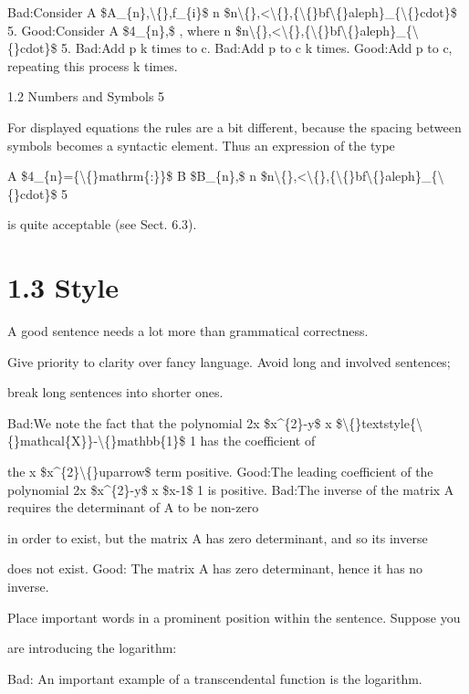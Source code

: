\documentclass[11pt]{article}
\theoremstyle{plain}
\theoremstyle{definition}
\begin{document}
Bad:Consider A \$A\_\{n\},\textbackslash\{\},f\_\{i\}\$ n \$n\textbackslash\{\},<\textbackslash\{\},\{\textbackslash\{\}bf\textbackslash\{\}aleph\}\_\{\textbackslash\{\}cdot\}\$ 5. Good:Consider A \$4\_\{n\},\$ , where n \$n\textbackslash\{\},<\textbackslash\{\},\{\textbackslash\{\}bf\textbackslash\{\}aleph\}\_\{\textbackslash\{\}cdot\}\$ 5. Bad:Add p k times to c. Bad:Add p to c k times. Good:Add p to c, repeating this process k times.

1.2 Numbers and Symbols 5

For displayed equations the rules are a bit different, because the spacing between symbols becomes a syntactic element. Thus an expression of the type

A \$4\_\{n\}=\{\textbackslash\{\}mathrm\{:\}\}\$ B \$B\_\{n\},\$ n \$n\textbackslash\{\},<\textbackslash\{\},\{\textbackslash\{\}bf\textbackslash\{\}aleph\}\_\{\textbackslash\{\}cdot\}\$ 5

is quite acceptable (see Sect. 6.3).

\section{1.3 Style}

A good sentence needs a lot more than grammatical correctness.

\textbullet{} Give priority to clarity over fancy language. Avoid long and involved sentences;

break long sentences into shorter ones.

Bad:We note the fact that the polynomial 2x \$x\textasciicircum{}\{2\}-y\$ x \$\textbackslash\{\}textstyle\{\textbackslash\{\}mathcal\{X\}\}-\textbackslash\{\}mathbb\{1\}\$ 1 has the coefficient of

the x \$x\textasciicircum{}\{2\}\textbackslash\{\}uparrow\$ term positive. Good:The leading coefficient of the polynomial 2x \$x\textasciicircum{}\{2\}-y\$ x \$x-1\$ 1 is positive. Bad:The inverse of the matrix A requires the determinant of A to be non-zero

in order to exist, but the matrix A has zero determinant, and so its inverse

does not exist. Good: The matrix A has zero determinant, hence it has no inverse.

\textbullet{} Place important words in a prominent position within the sentence. Suppose you

are introducing the logarithm:

Bad: An important example of a transcendental function is the logarithm.
\end{document}
